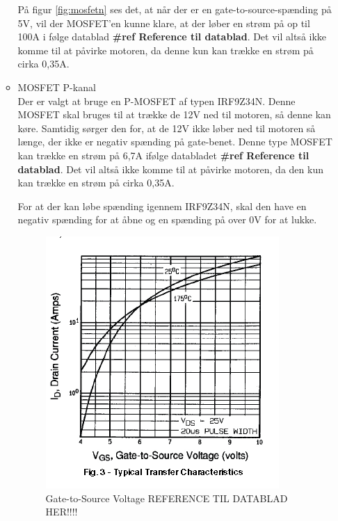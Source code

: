\begin{itemize}
\begin{itemize}
	På figur \ref{fig:mosfetn} ses det, at når der er en gate-to-source-spænding på 5V, vil der MOSFET'en kunne klare, at der løber en strøm på op til 100A i følge datablad \textbf{\#ref Reference til datablad}. Det vil altså ikke komme til at påvirke motoren, da denne kun kan trække en strøm på cirka 0,35A. 
	
\item MOSFET P-kanal \\
	Der er valgt at bruge en P-MOSFET af typen IRF9Z34N. Denne MOSFET skal bruges til at trække de 12V ned til motoren, så denne kan køre. Samtidig sørger den for, at de 12V ikke løber ned til motoren så længe, der ikke er negativ spænding på gate-benet. 
	Denne type MOSFET kan trække en strøm på 6,7A ifølge databladet \textbf{\#ref Reference til datablad}. Det vil altså ikke komme til at påvirke motoren, da den kun kan trække en strøm på cirka 0,35A. 
	
	For at der kan løbe spænding igennem IRF9Z34N, skal den have en negativ spænding for at åbne og en spænding på over 0V for at lukke. 
		
	\begin{figure}[H]
		\centering
		\includegraphics[width=\textwidth]{DesignOgImplementering/images/grafp}
		\caption{Gate-to-Source Voltage REFERENCE TIL DATABLAD HER!!!!}
		\label{fig:mosfetp}
	\end{figure}
	

\end{itemize}
\end{itemize}
